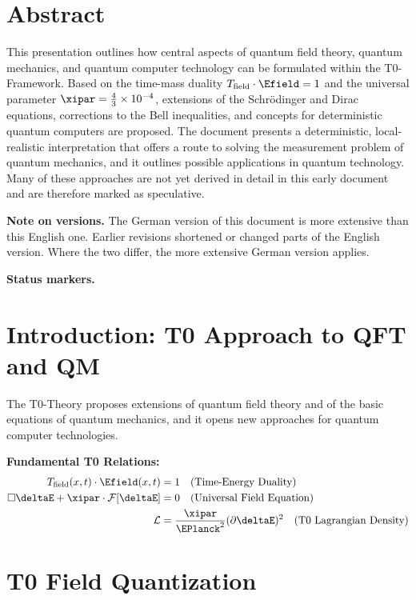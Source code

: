 \section*{Abstract}
		This presentation outlines how central aspects of quantum field theory, quantum mechanics, and quantum computer technology can be formulated within the T0-Framework. Based on the time-mass duality $T_{\text{field}} \cdot \Efield = 1$ and the universal parameter $\xipar = \frac{4}{3} \times 10^{-4}$, extensions of the Schrödinger and Dirac equations, corrections to the Bell inequalities, and concepts for deterministic quantum computers are proposed. The document presents a deterministic, local-realistic interpretation that offers a route to solving the measurement problem of quantum mechanics, and it outlines possible applications in quantum technology. Many of these approaches are not yet derived in detail in this early document and are therefore marked as speculative.

	\medskip\noindent\textbf{Note on versions.} The German version of this document is more extensive than this English one. Earlier revisions shortened or changed parts of the English version. Where the two differ, the more extensive German version applies.


	\medskip\noindent\textbf{Status markers.}
	

	\section{Introduction: T0 Approach to QFT and QM}
	The T0-Theory proposes extensions of quantum field theory and of the basic equations of quantum mechanics, and it opens new approaches for quantum computer technologies.
	\begin{tcolorbox}[colback=blue!5!white,colframe=blue!75!black,title={T0 Basic Principles for QFT and QM}]
		\textbf{Fundamental T0 Relations:}
		\begin{align}
			T_{\text{field}}(x,t) \cdot \Efield(x,t) &= 1 \quad \text{(Time-Energy Duality)} \\
			\square \deltaE + \xipar \cdot \mathcal{F}[\deltaE] &= 0 \quad \text{(Universal Field Equation)} \\
			\mathcal{L} &= \frac{\xipar}{\EPlanck^2} (\partial \deltaE)^2 \quad \text{(T0 Lagrangian Density)}
		\end{align}
	\end{tcolorbox}
	\section{T0 Field Quantization}
